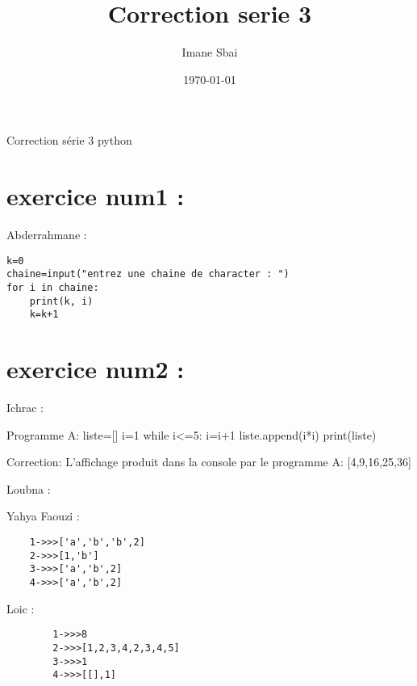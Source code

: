 \documentclass{article}
\title{Correction serie 3}
\author{Imane Sbai}
\date {\today}
\begin{document}
\begin{titlepage}
    \begin{center}
Correction s\'{e}rie 3 python
    \end{center}
\end{titlepage}

\section{exercice num1 :}
	\begin{center}
    		Abderrahmane :
	\end{center} 
	
\begin{lstlisting}
k=0
chaine=input("entrez une chaine de character : ")
for i in chaine:
	print(k, i)
	k=k+1
\end{lstlisting}
\section{exercice num2 :}

	\begin{center}
    		Ichrac :
	\end{center}
	
	\begin{lstlistings}
	Programme A:
	liste=[]
	i=1
	while i<=5:
		i=i+1
		liste.append(i*i)
	print(liste)
	
	Correction:
	L'affichage produit dans la console par le programme A: [4,9,16,25,36]
	\end{lstlistings}
	
	\begin{center}
    		Loubna :
	\end{center} 
	

        \begin{center}
    		 Yahya Faouzi :
	\end{center}    	  
        	
    \begin{lstlisting}
    1->>>['a','b','b',2]
    2->>>[1,'b']
    3->>>['a','b',2]
    4->>>['a','b',2]
    \end{lstlisting}
         
	\begin{center}
    		Loic :
	\end{center} 
	
	\begin{lstlisting}
		1->>>8
		2->>>[1,2,3,4,2,3,4,5]
		3->>>1
		4->>>[[],1]
	\end{lstlisting}
	
\end{document}
